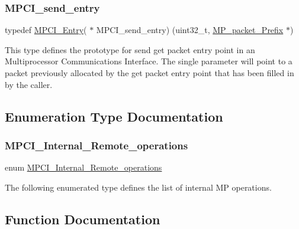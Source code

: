 \subsubsection{\texorpdfstring{MPCI\_send\_entry}{MPCI\_send\_entry}}
{\footnotesize\ttfamily typedef \mbox{\hyperlink{group__RTEMSScoreMPCI_ga110fdd671fbc411706e2b281c1685816}{M\+P\+C\+I\+\_\+\+Entry}}( $\ast$ M\+P\+C\+I\+\_\+send\+\_\+entry) (uint32\+\_\+t, \mbox{\hyperlink{structMP__packet__Prefix}{M\+P\+\_\+packet\+\_\+\+Prefix}} $\ast$)}

This type defines the prototype for send get packet entry point in an Multiprocessor Communications Interface. The single parameter will point to a packet previously allocated by the get packet entry point that has been filled in by the caller. 

\subsection{Enumeration Type Documentation}
\mbox{\label{group__RTEMSScoreMPCI_ga04a2fa1c1617558e729e75700624cdb7}} 
\subsubsection{\texorpdfstring{MPCI\_Internal\_Remote\_operations}{MPCI\_Internal\_Remote\_operations}}
{\footnotesize\ttfamily enum \mbox{\hyperlink{group__RTEMSScoreMPCI_ga04a2fa1c1617558e729e75700624cdb7}{M\+P\+C\+I\+\_\+\+Internal\+\_\+\+Remote\+\_\+operations}}}

The following enumerated type defines the list of internal MP operations. 

\subsection{Function Documentation}
\mbox{\label{group__RTEMSScoreMPCI_gacbb0099162582a23bc5a251b5a763612}} 
